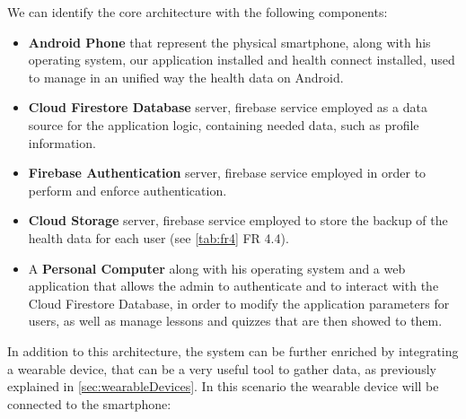 \newpage
\noindent We can identify the core architecture with the following components:
\vspace{3ex}
\begin{itemize}[nosep] %
    \item \textbf{Android Phone} that represent the physical smartphone, along with his operating system, our application installed and health connect installed, used to manage in an unified way the health data on Android.
    \item \textbf{Cloud Firestore Database} server, firebase service employed as a data source for the application logic, containing needed data, such as profile information.
    \item \textbf{Firebase Authentication} server, firebase service employed in order to perform and enforce authentication.
    \item \textbf{Cloud Storage} server, firebase service employed to store the backup of the health data for each user (see \cref{tab:fr4} FR 4.4).
    \item A \textbf{Personal Computer} along with his operating system and a web application that allows the admin to authenticate and to interact with the Cloud Firestore Database, in order to modify the application parameters for users, as well as manage lessons and quizzes that are then showed to them.  
\end{itemize}
\newpage
\noindent In addition to this architecture, the system can be further enriched by integrating a wearable device, that can be a very useful tool to gather data, as previously explained in \cref{sec:wearableDevices}. In this scenario the wearable device will be connected to the smartphone:

